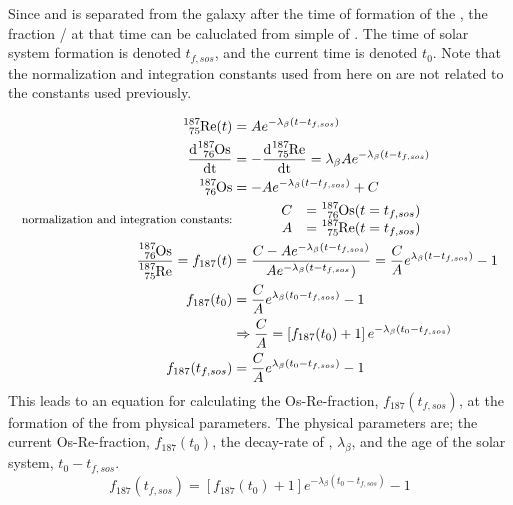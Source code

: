 Since  and  is separated from the galaxy after the time of formation of the \sos,
the fraction / at that time can be caluclated from simple \betadecay of .
The time of solar system formation is denoted $t_{f,sos}$, and the current time is denoted $t_0$.
Note that the normalization and integration constants used from here on are not related to the constants used previously.

\begin{align*}
  \re{187}(t) &= A e^{-\lambda_\beta (t-t_{f,sos})} \\
  \d{\os{187}} &= -\d{\re{187}} = \lambda_\beta A e^{-\lambda_\beta (t-t_{f,sos})} \\
  \os{187} &= - A e^{-\lambda_\beta (t-t_{f,sos})} + C \\
  \textrm{\footnotesize normalization and integration constants:} &
  \hspace{3em}
  \begin{array}{rl}
    C &= \os{187}(t=t_{f,sos}) \\
    A &= \re{187}(t=t_{f,sos})
  \end{array} \\
  \fraction = f_{187}(t) &= \frac{C - Ae^{-\lambda_\beta (t-t_{f,sos})}}{Ae^{-\lambda_\beta (t-t_{f,sos}})}
  = \frac{C}{A}e^{\lambda_\beta (t-t_{f,sos})} - 1 \\
  f_{187}(t_0) &= \frac{C}{A}e^{\lambda_\beta (t_0-t_{f,sos})} - 1 \\
  & \Rightarrow \frac{C}{A} = \left[ f_{187}(t_0) + 1\right]e^{-\lambda_\beta (t_0-t_{f,sos})} \\
  f_{187}(t_{f,sos}) &= \frac{C}{A}e^{\lambda_\beta (t_0-t_{f,sos})} - 1
\end{align*}
This leads to an equation for calculating the Os-Re-fraction, $f_{187}(t_{f,sos})$, at the formation of the \sos from physical parameters.
The physical parameters are; the current Os-Re-fraction, $f_{187}(t_{0})$, the decay-rate of , $\lambda_\beta$, and the age of the solar system, $t_0-t_{f,sos}$.
\begin{equation}
  \label{eq:frac-fsos}
  f_{187}(t_{f,sos}) = \left[ f_{187}(t_0) + 1\right]e^{-\lambda_\beta (t_0-t_{f,sos})} - 1
\end{equation}


